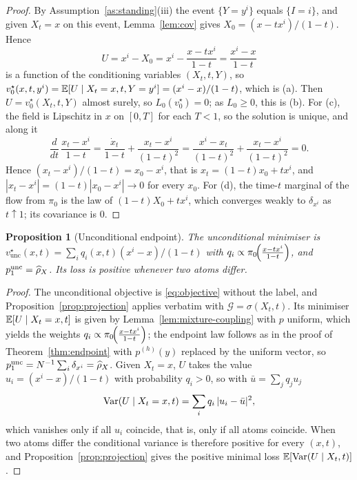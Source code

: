 \documentclass{article} %
\theoremstyle{plain}
\newtheorem{proposition}[theorem]{Proposition}
\theoremstyle{definition}
\theoremstyle{remark}
\begin{document}
\label{apx:pf-collapse}
\propcollapse*
\begin{proof}
By Assumption~\ref{as:standing}(iii) the event $\{Y=y^i\}$ equals $\{I=i\}$, and given $X_t=x$ on
this event, Lemma~\ref{lem:cov} gives $X_0=(x-tx^i)/(1-t)$. Hence
\[
U=x^i-X_0=x^i-\frac{x-tx^i}{1-t}=\frac{x^i-x}{1-t}
\]
is a function of the conditioning variables $(X_t,t,Y)$, so
$v_0^\star(x,t,y^i)=\mathbb{E}[U\mid X_t=x,t,Y=y^i]=(x^i-x)/(1-t)$, which is (a). Then
$U=v_0^\star(X_t,t,Y)$ almost surely, so $L_0(v_0^\star)=0$; as $L_0\ge0$, this is (b). For (c), the
field is Lipschitz in $x$ on $[0,T]$ for each $T<1$, so the solution is unique, and along it
\[
\frac{d}{dt}\,\frac{x_t-x^i}{1-t}=\frac{\dot x_t}{1-t}+\frac{x_t-x^i}{(1-t)^2}
=\frac{x^i-x_t}{(1-t)^2}+\frac{x_t-x^i}{(1-t)^2}=0 .
\]
Hence $(x_t-x^i)/(1-t)=x_0-x^i$, that is $x_t=(1-t)x_0+tx^i$, and $|x_t-x^i|=(1-t)|x_0-x^i|\to0$ for
every $x_0$. For (d), the time-$t$ marginal of the flow from $\pi_0$ is the law of
$(1-t)X_0+tx^i$, which converges weakly to $\delta_{x^i}$ as $t\uparrow1$; its covariance is
$0$.
\end{proof}

\begin{proposition}[Unconditional endpoint]
\label{prop:uncond}
The unconditional minimiser is $v_{\mathrm{unc}}^\star(x,t)=\sum_iq_i(x,t)(x^i-x)/(1-t)$ with
$q_i\propto\pi_0\!\Big(\frac{x-tx^{i}}{1-t}\Big)$, and $p_1^{\mathrm{unc}}=\widehat{\rho}_X$. Its loss is positive whenever two atoms
differ.
\end{proposition}
\begin{proof}
\label{apx:pf-uncond}
The unconditional objective is \eqref{eq:objective} without the label, and
Proposition~\ref{prop:projection} applies verbatim with $\mathcal G=\sigma(X_t,t)$. Its minimiser
$\mathbb{E}[U\mid X_t=x,t]$ is given by Lemma~\ref{lem:mixture-coupling} with $p$ uniform, which yields
the weights $q_i\propto\pi_0\!\Big(\frac{x-tx^{i}}{1-t}\Big)$; the endpoint law follows as in the proof of
Theorem~\ref{thm:endpoint} with $p^{(h)}(y)$ replaced by the uniform vector, so
$p_1^{\mathrm{unc}}=N^{-1}\sum_i\delta_{x^i}=\widehat{\rho}_X$. Given $X_t=x$, $U$ takes the value
$u_i=(x^i-x)/(1-t)$ with probability $q_i>0$, so with $\bar u=\sum_jq_ju_j$
\[
\operatorname{Var}(U\mid X_t=x,t)=\sum_iq_i\,|u_i-\bar u|^2 ,
\]
which vanishes only if all $u_i$ coincide, that is, only if all atoms coincide. When two atoms
differ the conditional variance is therefore positive for every $(x,t)$, and
Proposition~\ref{prop:projection} gives the positive minimal loss
$\mathbb{E}[\operatorname{Var}(U\mid X_t,t)]$.
\end{proof}
\end{document}
